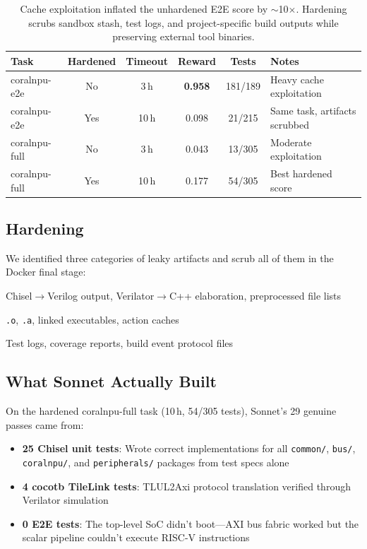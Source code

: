 \documentclass[11pt,a4paper]{article}
\begin{document}
\begin{table}[h]
\centering
\small
\begin{tabularx}{\textwidth}{@{}lccccX@{}}
\toprule
\textbf{Task} & \textbf{Hardened} & \textbf{Timeout} & \textbf{Reward} & \textbf{Tests} & \textbf{Notes} \\
\midrule
coralnpu-e2e & No & 3\,h & \textbf{0.958} & 181/189 & Heavy cache exploitation \\
coralnpu-e2e & Yes & 10\,h & 0.098 & 21/215 & Same task, artifacts scrubbed \\
coralnpu-full & No & 3\,h & 0.043 & 13/305 & Moderate exploitation \\
coralnpu-full & Yes & 10\,h & 0.177 & 54/305 & Best hardened score \\
\bottomrule
\end{tabularx}
\caption{Cache exploitation inflated the unhardened E2E score by $\sim$10$\times$. Hardening scrubs sandbox stash, test logs, and project-specific build outputs while preserving external tool binaries.}
\label{tab:coralnpu}
\end{table}

\subsection{Hardening}

We identified three categories of leaky artifacts and scrub all of them in the Docker final stage:

\begin{description}[nosep]
\item[Category 1 --- Generated source:] Chisel$\to$Verilog output, Verilator$\to$C++ elaboration, preprocessed file lists
\item[Category 2 --- Compiled objects:] \texttt{.o}, \texttt{.a}, linked executables, action caches
\item[Category 3 --- Logs/metadata:] Test logs, coverage reports, build event protocol files
\end{description}

\subsection{What Sonnet Actually Built}

On the hardened coralnpu-full task (10\,h, 54/305 tests), Sonnet's 29 genuine passes came from:

\begin{itemize}[nosep]
\item \textbf{25 Chisel unit tests}: Wrote correct implementations for all \texttt{common/}, \texttt{bus/}, \texttt{coralnpu/}, and \texttt{peripherals/} packages from test specs alone
\item \textbf{4 cocotb TileLink tests}: TLUL2Axi protocol translation verified through Verilator simulation
\item \textbf{0 E2E tests}: The top-level SoC didn't boot---AXI bus fabric worked but the scalar pipeline couldn't execute RISC-V instructions
\end{itemize}
\end{document}
